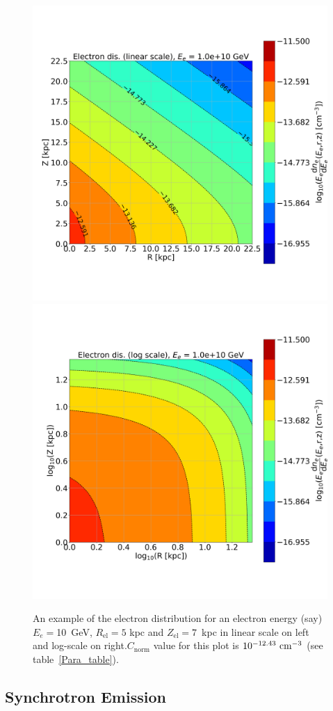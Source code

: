 \documentclass[usenatbib]{mnras}
\newcommand{\Andrew}[1]{\textcolor{dg}{#1}}
\begin{document}
\begin{figure}
\centering
\includegraphics[width=0.49\linewidth]{Images/Linear_EdNdE.png}%
\includegraphics[width = 0.49\linewidth]{Images/Log_EdNdE.png}
\caption{An example of the electron distribution for an electron energy (say) $E_e = $10~GeV, $R_{\mathrm{el}} = 5$ kpc and $Z_{\mathrm{el}} = 7$~kpc in linear scale on left and log-scale on right.$C_\mathrm{norm}$ value for this plot is $10^{-12.43}~{\rm cm}^{-3}$ (see table~\ref{Para_table}).}  %
\label{fig:electron_density}
\end{figure}


\subsection{Synchrotron Emission}\label{Synchrotron_theory}
\end{document}

